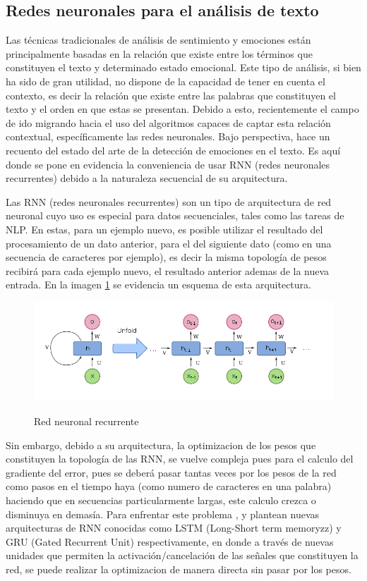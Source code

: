 \subsection{Redes neuronales para el análisis de texto}

Las técnicas tradicionales de análisis de sentimiento y emociones están principalmente basadas en la relación que existe entre los términos que constituyen el texto y determinado estado emocional. Este tipo de análisis, si bien ha sido de gran utilidad, no dispone de la capacidad de tener en cuenta el contexto, es decir la relación que existe entre las palabras que constituyen el texto y el orden en que estas se presentan. Debido a esto, recientemente el campo de ido migrando hacia el uso del algoritmos capaces de captar esta relación contextual, específicamente las redes neuronales. Bajo perspectiva, \cite{acheampong2021transformer} hace un recuento del estado del arte de la detección de emociones en el texto. Es aquí donde se pone en evidencia la conveniencia de usar RNN (redes neuronales recurrentes) debido a la naturaleza secuencial de su arquitectura. 

Las RNN (redes neuronales recurrentes) son un tipo de arquitectura de red neuronal cuyo uso es especial para datos secuenciales, tales como las tareas de NLP. En estas, para un ejemplo nuevo, es posible utilizar el resultado del procesamiento de un dato anterior, para el del siguiente dato (como en una secuencia de caracteres por ejemplo), es decir la misma topología de pesos recibirá para cada ejemplo nuevo, el resultado anterior ademas de la nueva entrada. En la imagen \ref{figure:RNN} \cite{enwiki:1109264340} se evidencia un esquema de esta arquitectura.


\begin{figure}[h]
	\caption{Red neuronal recurrente}
	\centering
	\includegraphics[scale=0.55]{Images & Logos/Recurrent_neural_network_unfold.svg.png} 
	\label{figure:RNN}
\end{figure}

 Sin embargo, debido a su arquitectura, la optimizacion de los pesos que constituyen la topología de las RNN, se vuelve compleja pues para el calculo del gradiente del error, pues se deberá pasar tantas veces por los pesos de la red como pasos en el tiempo haya (como numero de caracteres en una palabra) haciendo que en secuencias particularmente largas, este calculo crezca o disminuya en demasía. Para enfrentar este problema , \cite{hochreiter1997long} y \cite{chung2014empirical} plantean nuevas arquitecturas de RNN conocidas como LSTM (Long-Short term memoryzz) y GRU (Gated Recurrent Unit) respectivamente, en donde a través de nuevas unidades que permiten la activación/cancelación de las señales que constituyen la red, se puede realizar la optimizacion de manera directa sin pasar por los pesos.

